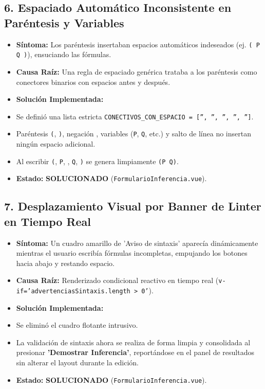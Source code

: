 \documentclass[11pt,a4paper,openany]{book}
\begin{document}
\hrulefill

\subsection{6.  Espaciado Automático Inconsistente en Paréntesis y Variables}

\begin{itemize}[leftmargin=*]
\item \textbf{Síntoma:} Los paréntesis insertaban espacios automáticos indeseados (ej. \texttt{( P  Q )}), ensuciando las fórmulas.
\item \textbf{Causa Raíz:} Una regla de espaciado genérica trataba a los paréntesis como conectores binarios con espacios antes y después.
\item \textbf{Solución Implementada:}
\item Se definió una lista estricta \texttt{CONECTIVOS\_CON\_ESPACIO = ['', '', '', '', '']}.
\item Paréntesis \texttt{(}, \texttt{)}, negación \texttt{}, variables (\texttt{P}, \texttt{Q}, etc.) y salto de línea no insertan ningún espacio adicional.
\item Al escribir \texttt{(}, \texttt{P}, \texttt{}, \texttt{Q}, \texttt{)} se genera limpiamente \texttt{(P  Q)}.
\item \textbf{Estado:}  \textbf{SOLUCIONADO} (\texttt{FormularioInferencia.vue}).
\end{itemize}

\hrulefill

\subsection{7.  Desplazamiento Visual por Banner de Linter en Tiempo Real}

\begin{itemize}[leftmargin=*]
\item \textbf{Síntoma:} Un cuadro amarillo de 'Aviso de sintaxis' aparecía dinámicamente mientras el usuario escribía fórmulas incompletas, empujando los botones hacia abajo y restando espacio.
\item \textbf{Causa Raíz:} Renderizado condicional reactivo en tiempo real (\texttt{v-if='advertenciasSintaxis.length > 0'}).
\item \textbf{Solución Implementada:}
\item Se eliminó el cuadro flotante intrusivo.
\item La validación de sintaxis ahora se realiza de forma limpia y consolidada al presionar \textbf{'Demostrar Inferencia'}, reportándose en el panel de resultados sin alterar el layout durante la edición.
\item \textbf{Estado:}  \textbf{SOLUCIONADO} (\texttt{FormularioInferencia.vue}).
\end{itemize}
\end{document}
